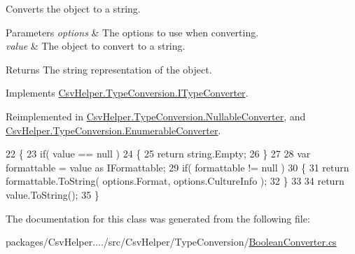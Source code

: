 Converts the object to a string. 


\begin{DoxyParams}{Parameters}
{\em options} & The options to use when converting.\\
\hline
{\em value} & The object to convert to a string.\\
\hline
\end{DoxyParams}
\begin{DoxyReturn}{Returns}
The string representation of the object.
\end{DoxyReturn}


Implements \hyperlink{a00097_a90c465c63dbcf913f38aa878f35e77c7}{Csv\-Helper.\-Type\-Conversion.\-I\-Type\-Converter}.



Reimplemented in \hyperlink{a00114_a7205cdb61d2d119582958232b3e63109}{Csv\-Helper.\-Type\-Conversion.\-Nullable\-Converter}, and \hyperlink{a00076_a7e07e9532857d748654d37db590a0e11}{Csv\-Helper.\-Type\-Conversion.\-Enumerable\-Converter}.


\begin{DoxyCode}
22         \{
23             \textcolor{keywordflow}{if}( value == null )
24             \{
25                 \textcolor{keywordflow}{return} string.Empty;
26             \}
27 
28             var formattable = value as IFormattable;
29             \textcolor{keywordflow}{if}( formattable != null )
30             \{
31                 \textcolor{keywordflow}{return} formattable.ToString( options.Format, options.CultureInfo );
32             \}
33 
34             \textcolor{keywordflow}{return} value.ToString();
35         \}
\end{DoxyCode}


The documentation for this class was generated from the following file\-:\begin{DoxyCompactItemize}
\item 
packages/\-Csv\-Helper..../src/\-Csv\-Helper/\-Type\-Conversion/\hyperlink{a00220}{Boolean\-Converter.\-cs}\end{DoxyCompactItemize}
